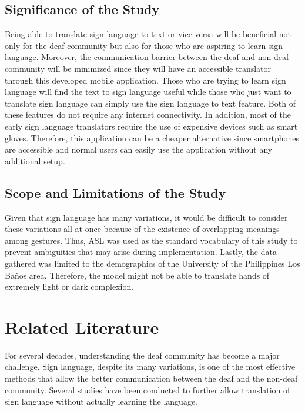 \documentclass[journal]{./IEEE/IEEEtran}
\begin{document}
\subsection{Significance of the Study}
\indent Being able to translate sign language to text or vice-versa will be beneficial not only for the deaf community but also for those who are aspiring to learn sign language. Moreover, the communication barrier between the deaf and non-deaf community will be minimized since they will have an accessible translator through this developed mobile application.
\newline
\indent Those who are trying to learn sign language will find the text to sign language useful while those who just want to translate sign language can simply use the sign language to text feature. Both of these features do not require any internet connectivity.
\newline
\indent In addition, most of the early sign language translators require the use of expensive devices such as smart gloves. Therefore, this application can be a cheaper alternative since smartphones are accessible and normal users can easily use the application without any additional setup. 

\subsection{Scope and Limitations of the Study}
\indent Given that sign language has many variations, it would be difficult to consider these variations all at once because of the existence of overlapping meanings among gestures. Thus, ASL was used as the standard vocabulary of this study to prevent ambiguities that may arise during implementation.
\newline
\indent Lastly, the data gathered was limited to the demographics of the University of the Philippines Los Ba\~{n}os area. Therefore, the model might not be able to translate hands of extremely light or dark complexion.
\newline

\section{Related Literature}
For several decades, understanding the deaf community has become a major challenge. Sign language, despite its many variations, is one of the most effective methods that allow the better communication between the deaf and the non-deaf community. Several studies have been conducted to further allow translation of sign language without actually learning the language.
\end{document}

